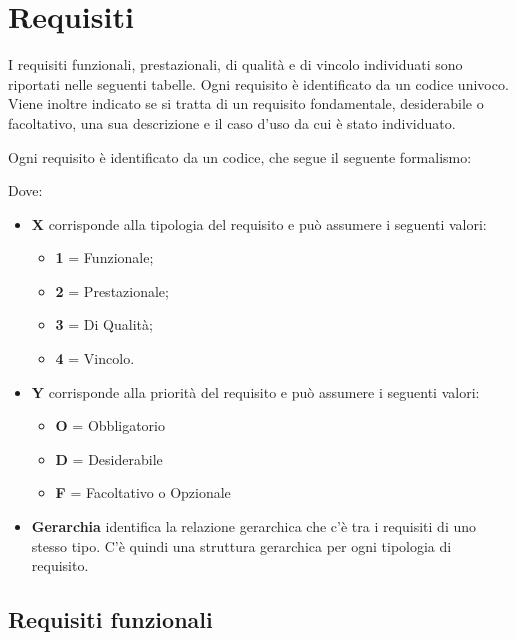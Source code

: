 \section{Requisiti }
I requisiti funzionali, prestazionali, di qualità e di vincolo individuati sono riportati nelle seguenti tabelle. Ogni requisito è identificato da un codice univoco.
Viene inoltre indicato se si tratta di un requisito fondamentale, desiderabile o facoltativo, una sua descrizione e il caso d'uso da cui è stato individuato. 

Ogni requisito è identificato da un codice, che segue il seguente formalismo:
\begin{center}
\end{center}

Dove:
\begin{itemize}
 \item \textbf{X} corrisponde alla tipologia del requisito e può assumere i seguenti valori:
		\begin{itemize}
		 \item[] \textbf{1} = Funzionale;
		 \item[] \textbf{2} = Prestazionale;
		 \item[] \textbf{3} = Di Qualità;
		 \item[] \textbf{4} = Vincolo.
		\end{itemize}

 \item \textbf{Y} corrisponde alla priorità del requisito e può assumere i seguenti valori:
		\begin{itemize}
		 \item[] \textbf{O} = Obbligatorio
		 \item[] \textbf{D} = Desiderabile
		 \item[] \textbf{F} = Facoltativo o Opzionale
		\end{itemize}

 \item \textbf{Gerarchia} identifica la relazione gerarchica che c'è tra i requisiti di uno stesso tipo. C'è quindi una struttura gerarchica per ogni tipologia di requisito.
\end{itemize}

\subsection{Requisiti funzionali}

